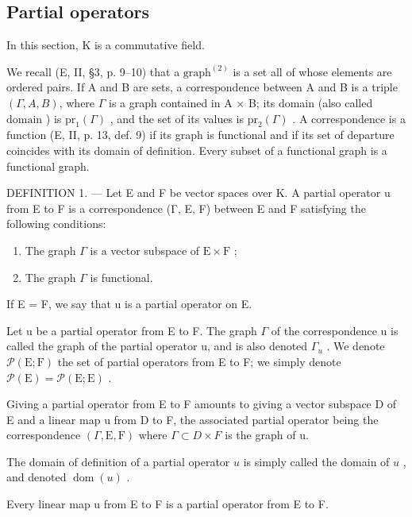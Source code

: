 \subsection{Partial operators}

In this section, K is a commutative field.

We recall (E, II, §3, p. 9–10) that a \(\text{graph}^{(2)}\) is a set all of whose elements are ordered pairs. If A and B are sets, a \(\text{correspondence}\) between A and B is a triple \((\Gamma, A, B)\), where \(\Gamma\) is a graph contained in A × B; its domain (also called \(\text{domain}\) ) is \(\text{pr}_1(\Gamma)\) , and the set of its values is \(\text{pr}_2(\Gamma)\) . A correspondence is a \(\text{function}\) (E, II, p. 13, def. 9) if its graph is functional and if its set of departure coincides with its domain of definition. Every subset of a functional graph is a functional graph.

DEFINITION 1. --- Let E and F be vector spaces over K. A partial operator u from E to F is a correspondence (Γ, E, F) between E and F satisfying the following conditions:

\begin{enumerate}
\def\labelenumi{(\roman{enumi})}
\item
  The graph \(\Gamma\) is a vector subspace of \(\mathrm{E} \times \mathrm{F}\) ;
\item
  The graph \(\Gamma\) is functional.
\end{enumerate}

If E = F, we say that u is a partial operator on E.

Let u be a partial operator from E to F. The graph \(\Gamma\) of the correspondence u is called the graph of the partial operator u, and is also denoted \(\Gamma_{u}\) . We denote \(\mathcal{P}(\mathrm{E};\mathrm{F})\) the set of partial operators from E to F; we simply denote \(\mathcal{P}(\mathrm{E}) = \mathcal{P}(\mathrm{E};\mathrm{E})\) .

Giving a partial operator from E to F amounts to giving a vector subspace D of E and a linear map u from D to F, the associated partial operator being the correspondence \((\Gamma, \mathrm{E}, \mathrm{F})\) where \(\Gamma \subset D \times F\) is the graph of u.

The domain of definition of a partial operator \(u\) is simply called the domain of \(u\) , and denoted \(\operatorname{dom}(u)\) .

Every linear map u from E to F is a partial operator from E to F.

